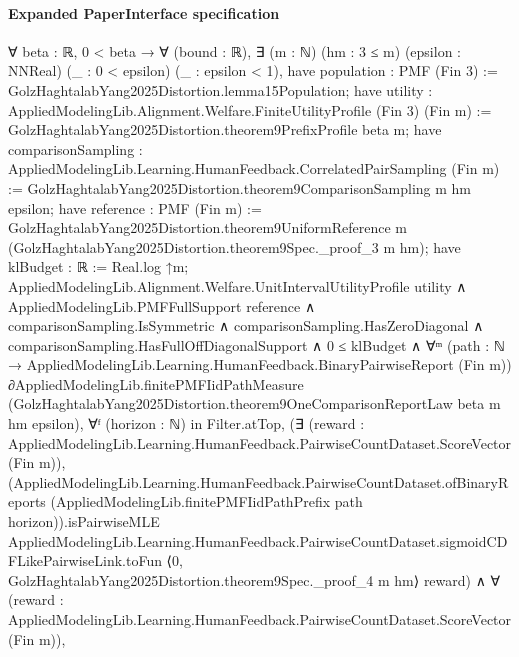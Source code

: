\documentclass[10pt]{article}
\begin{document}
\paragraph{Expanded PaperInterface specification}
\begin{ReviewVerbatim}
∀ {beta : ℝ},
  0 < beta →
    ∀ (bound : ℝ),
      ∃ (m : ℕ) (hm : 3 ≤ m) (epsilon : NNReal) (_ : 0 < epsilon) (_ : epsilon < 1),
        have population : PMF (Fin 3) := GolzHaghtalabYang2025Distortion.lemma15Population;
        have utility : AppliedModelingLib.Alignment.Welfare.FiniteUtilityProfile (Fin 3) (Fin m) :=
          GolzHaghtalabYang2025Distortion.theorem9PrefixProfile beta m;
        have comparisonSampling : AppliedModelingLib.Learning.HumanFeedback.CorrelatedPairSampling (Fin m) :=
          GolzHaghtalabYang2025Distortion.theorem9ComparisonSampling m hm epsilon;
        have reference : PMF (Fin m) :=
          GolzHaghtalabYang2025Distortion.theorem9UniformReference m
            (GolzHaghtalabYang2025Distortion.theorem9Spec._proof_3 m hm);
        have klBudget : ℝ := Real.log ↑m;
        AppliedModelingLib.Alignment.Welfare.UnitIntervalUtilityProfile utility ∧
          AppliedModelingLib.PMFFullSupport reference ∧
            comparisonSampling.IsSymmetric ∧
              comparisonSampling.HasZeroDiagonal ∧
                comparisonSampling.HasFullOffDiagonalSupport ∧
                  0 ≤ klBudget ∧
                    ∀ᵐ (path :
                      ℕ →
                        AppliedModelingLib.Learning.HumanFeedback.BinaryPairwiseReport
                          (Fin
                            m)) ∂AppliedModelingLib.finitePMFIidPathMeasure
                        (GolzHaghtalabYang2025Distortion.theorem9OneComparisonReportLaw beta m hm epsilon),
                      ∀ᶠ (horizon : ℕ) in Filter.atTop,
                        (∃ (reward :
                            AppliedModelingLib.Learning.HumanFeedback.PairwiseCountDataset.ScoreVector (Fin m)),
                            (AppliedModelingLib.Learning.HumanFeedback.PairwiseCountDataset.ofBinaryReports
                                  (AppliedModelingLib.finitePMFIidPathPrefix path horizon)).isPairwiseMLE
                              AppliedModelingLib.Learning.HumanFeedback.PairwiseCountDataset.sigmoidCDFLikePairwiseLink.toFun
                              ⟨0, GolzHaghtalabYang2025Distortion.theorem9Spec._proof_4 m hm⟩ reward) ∧
                          ∀
                            (reward :
                              AppliedModelingLib.Learning.HumanFeedback.PairwiseCountDataset.ScoreVector (Fin m)),

\end{ReviewVerbatim}
\end{document}
